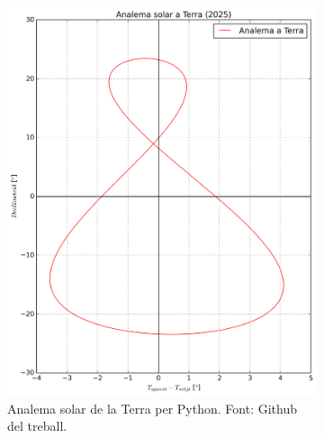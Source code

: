\documentclass[a4paper, 11pt]{article}
\begin{document}
\begin{figure}[h!]
\begin{subfigure}{0.52\textwidth}
        \includegraphics[width=\textwidth]{images/analema_Terra.png}
        \caption{Analema solar de la Terra per Python. Font: Github del treball.}
    \end{subfigure}
    \hspace{0.05\textwidth}
    \begin{subfigure}{0.38\textwidth}
        \centering

\end{subfigure}
\end{figure}
\end{document}
